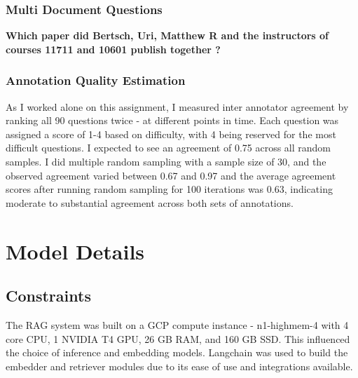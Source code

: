 \documentclass[11pt]{article}
\begin{document}
\subsubsection{Multi Document Questions}

\textbf{Which paper did Bertsch, Uri, Matthew R and the instructors of courses 11711 and 10601 publish together ?}

\subsubsection{Annotation Quality Estimation}

As I worked alone on this assignment, I measured inter annotator agreement by ranking all 90 questions twice - at different points in time. Each question was assigned a score of 1-4 based on difficulty, with 4 being reserved for the most difficult questions. I expected to see an agreement of 0.75 across all random samples.
I did multiple random sampling with a sample size of 30, and the observed agreement varied between 0.67 and 0.97 and the average agreement scores after running random sampling for 100 iterations was 0.63, indicating moderate to substantial agreement across both sets of annotations.

\clearpage
\section{Model Details}

\subsection{Constraints}
The RAG system was built on a GCP compute instance - n1-highmem-4 with 4 core CPU, 1 NVIDIA T4 GPU, 26 GB RAM, and 160 GB SSD. This influenced the choice of inference and embedding models.
Langchain \cite{lang-chain} was used to build the embedder and retriever modules due to its ease of use and integrations available.
\end{document}
